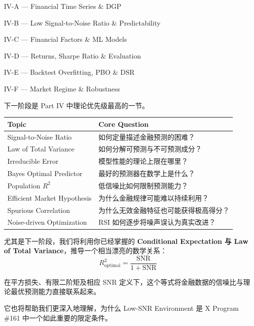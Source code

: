IV-A --- Financial Time Series \& DGP

IV-B --- Low Signal-to-Noise Ratio \& Predictability

IV-C --- Financial Factors \& ML Models

IV-D --- Returns, Sharpe Ratio \& Evaluation

IV-E --- Backtest Overfitting, PBO \& DSR

IV-F --- Market Regime \& Robustness

下一阶段是 Part IV 中理论优先级最高的一节。

\begin{readertable}
\begin{longtable}[]{@{}
  >{\raggedright\arraybackslash}p{}
  >{\raggedright\arraybackslash}p{}@{}}
\toprule
Topic & Core Question \\
\midrule
\endhead
Signal-to-Noise Ratio & 如何定量描述金融预测的困难？ \\
Law of Total Variance & 如何分解可预测与不可预测成分？ \\
Irreducible Error & 模型性能的理论上限在哪里？ \\
Bayes Optimal Predictor & 最好的预测器在数学上是什么？ \\
Population \(R^2\) & 低信噪比如何限制预测能力？ \\
Efficient Market Hypothesis & 为什么金融规律可能难以持续利用？ \\
Spurious Correlation & 为什么无效金融特征也可能获得极高得分？ \\
Noise-driven Optimization & RSI 如何逐步将噪声误认为真实改进？ \\
\bottomrule
\end{longtable}
\end{readertable}

尤其是下一阶段，我们将利用你已经掌握的 \textbf{Conditional Expectation 与 Law of Total Variance}，推导一个相当漂亮的数学关系：
\[\boxed{
R_{\mathrm{optimal}}^2
=
\frac{\mathrm{SNR}}{1+\mathrm{SNR}}
}\]

在平方损失、有限二阶矩及相应 SNR 定义下，这个等式将金融数据的信噪比与理论最优预测能力直接联系起来。

它也将帮助我们更深入地理解，为什么 Low-SNR Environment 是 X Program \#161 中一个如此重要的限定条件。
